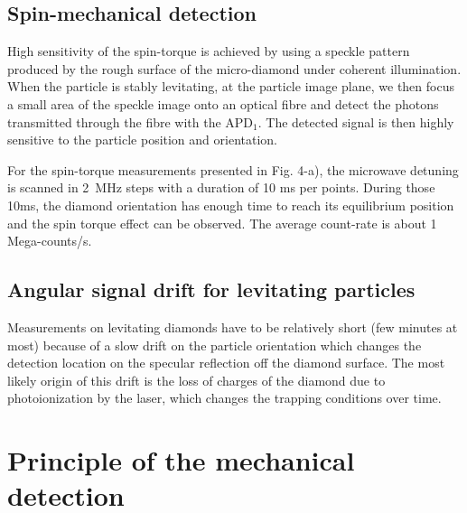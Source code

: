 \documentclass[preprintnumbers,amsmath,amssymb,onecolumn,12pt]{revtex4}
\begin{document}
\subsection{Spin-mechanical detection}

High sensitivity of the spin-torque is achieved by using a speckle pattern produced by the rough surface of the micro-diamond under coherent illumination. When the particle is stably levitating, at the particle image plane, we then focus a small area of the speckle image onto an optical fibre and detect the photons transmitted through the fibre with the APD$_1$. The detected signal is then highly sensitive to the particle position and orientation.

For the spin-torque measurements presented in Fig. 4-a), the microwave detuning is scanned in 2~MHz steps with a duration of 10 ms per points. During those 10ms, the diamond orientation has enough time to reach its equilibrium position and the spin torque effect can be observed. The average count-rate is about 1 Mega-counts/s. 

\subsection{Angular signal drift for levitating particles}

Measurements on levitating diamonds have to be relatively short (few minutes at most) because of a slow drift on the particle orientation which changes the detection location on the specular reflection off the diamond surface. The most likely origin of this drift is the loss of charges of the diamond due to photoionization by the laser, which changes the trapping conditions over time.



%

\section{Principle of the mechanical detection}
\end{document}

